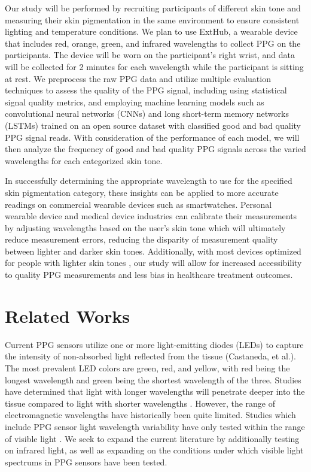 \documentclass[letterpaper, 10 pt, conference]{ieeeconf}  %
\begin{document}
Our study will be performed by recruiting participants of different skin tone and measuring their skin pigmentation in the same environment to ensure consistent lighting and temperature conditions. We plan to use ExtHub, a wearable device that includes red, orange, green, and infrared wavelengths to collect PPG on the participants. The device will be worn on the participant’s right wrist, and data will be collected for 2 minutes for each wavelength while the participant is sitting at rest. We preprocess the raw PPG data and utilize multiple evaluation techniques to assess the quality of the PPG signal, including using statistical signal quality metrics, and employing machine learning models such as convolutional neural networks (CNNs) and long short-term memory networks (LSTMs) trained on an open source dataset with classified good and bad quality PPG signal reads. With consideration of the performance of each model, we will then analyze the frequency of good and bad quality PPG signals across the varied wavelengths for each categorized skin tone.

In successfully determining the appropriate wavelength to use for the specified skin pigmentation category, these insights can be applied to more accurate readings on commercial wearable devices such as smartwatches. Personal wearable device and medical device industries can calibrate their measurements by adjusting wavelengths based on the user’s skin tone which will ultimately reduce measurement errors, reducing the disparity of measurement quality between lighter and darker skin tones. Additionally, with most devices optimized for people with lighter skin tones \cite{bent_investigating_2020}, our study will allow for increased accessibility to quality PPG measurements and less bias in healthcare treatment outcomes.

\section{Related Works}
Current PPG sensors utilize one or more light-emitting diodes (LEDs) to capture the intensity of non-absorbed light reflected from the tissue (Castaneda, et al.). The most prevalent LED colors are green, red, and yellow, with red being the longest wavelength and green being the shortest wavelength of the three. Studies have determined that light with longer wavelengths will penetrate deeper into the tissue compared to light with shorter wavelengths \cite{fallow_influence_2013}\cite{setchfield_effect_2024}. However, the range of electromagnetic wavelengths have historically been quite limited. Studies which include PPG sensor light wavelength variability have only tested within the range of visible light \cite{al-halawani_review_2023}\cite{fallow_influence_2013}. We seek to expand the current literature by additionally testing on infrared light, as well as expanding on the conditions under which visible light spectrums in PPG sensors have been tested. 
\end{document}

